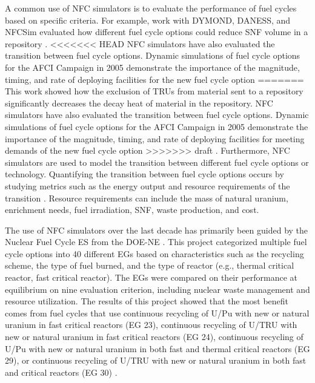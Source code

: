 A common use of \gls{NFC} simulators is to evaluate the performance 
of fuel cycles based on specific criteria. 
For example, work with \gls{DYMOND}, \gls{DANESS}, 
and \gls{NFCSim} evaluated how different fuel cycle options 
could reduce \gls{SNF} volume in a repository \cite{yacout_dynamic_2004}. 
<<<<<<< HEAD
\gls{NFC} simulators have also evaluated the transition between fuel cycle 
options. Dynamic simulations of fuel cycle options for the \gls{AFCI}
Campaign in 2005 demonstrate the importance of the magnitude, timing, 
and rate of deploying facilities for the new fuel cycle option 
=======
This work showed how the exclusion of \glspl{TRU} from material 
sent to a repository significantly decreases the decay heat 
of material in the repository. 
\gls{NFC} simulators have also evaluated the transition between fuel cycle 
options. Dynamic simulations of fuel cycle options for the \gls{AFCI}
Campaign in 2005 demonstrate the importance of the magnitude, timing, 
and rate of deploying facilities for meeting demands of the new fuel cycle option 
>>>>>>> draft
\cite{piet_assessment_2011}. Furthermore, \gls{NFC} simulators are 
used to model the transition between 
different fuel cycle options or technology. Quantifying the transition 
between fuel cycle options occurs by studying metrics such as the 
energy output and resource requirements of the transition 
\cite{del_cul_advanced_2010}. 
Resource requirements can include the mass of natural uranium, enrichment 
needs, fuel irradiation, \gls{SNF}, waste production, and cost. 

The use of \gls{NFC} simulators over the 
last decade has primarily been guided by the Nuclear Fuel Cycle \gls{ES} 
from the \gls{DOE-NE} \cite{wigeland_nuclear_2014}. This project
categorized multiple fuel cycle options into 40 different \glspl{EG} 
based on characteristics such as the recycling scheme, the type of fuel 
burned, 
and the type of reactor (e.g., thermal critical reactor, fast critical reactor). 
The \glspl{EG} were compared on their performance at equilibrium on nine evaluation 
criterion, including nuclear waste management and resource utilization. The 
results of this project showed that the most benefit comes from fuel cycles 
that use continuous recycling of U/Pu with new or natural uranium in fast critical 
reactors (\gls{EG} 23), continuous recycling of U/\gls{TRU} with new or natural 
uranium in fast critical reactors (\gls{EG} 24), continuous recycling of U/Pu 
with new or natural uranium in both fast and thermal critical reactors 
(\gls{EG} 29), or continuous recycling of U/\gls{TRU} with new or natural uranium in 
both fast and critical reactors (\gls{EG} 30) \cite{wigeland_nuclear_2014}. 

